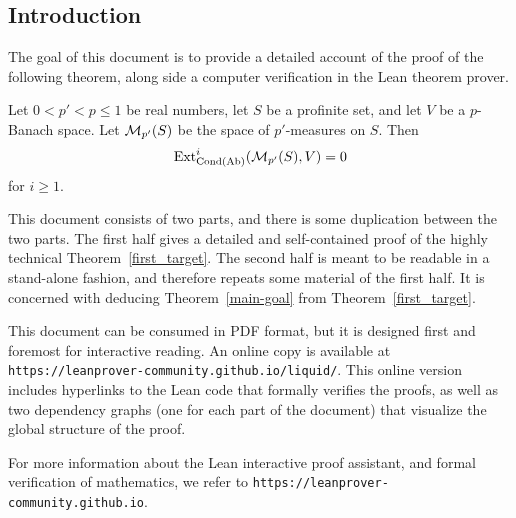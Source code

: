 \subsection*{Introduction}
\label{intro}

The goal of this document is to provide a detailed account
of the proof of the following theorem,
along side a computer verification in the Lean theorem prover.

\begin{theoremx}
  \label{main-goal}
  Let $0 < p' < p \le 1$ be real numbers,
  let $S$ be a profinite set,
  and let $V$ be a $p$-Banach space.
  Let $\mathcal M_{p'}(S)$ be the space of $p'$-measures on $S$.
  Then
  \[
    \operatorname{Ext}^i_{\operatorname{Cond}(\operatorname{Ab})}(\mathcal M_{p'}(S), V)=0
  \]
  for $i \ge 1$.
\end{theoremx}

This document consists of two parts, and there is some duplication between the two parts.
The first half gives a detailed and self-contained proof of the highly technical Theorem~\ref{first_target}.
The second half is meant to be readable in a stand-alone fashion, and therefore repeats some material of the first half.
It is concerned with deducing Theorem~\ref{main-goal} from Theorem~\ref{first_target}.

This document can be consumed in PDF format,
but it is designed first and foremost for interactive reading.
An online copy is available at
\texttt{https://leanprover-community.github.io/liquid/}.
This online version includes hyperlinks to the Lean code that formally verifies the proofs,
as well as two dependency graphs (one for each part of the document) that visualize the global structure of the proof.

For more information about the Lean interactive proof assistant, and formal verification of mathematics,
we refer to \texttt{https://leanprover-community.github.io}.

